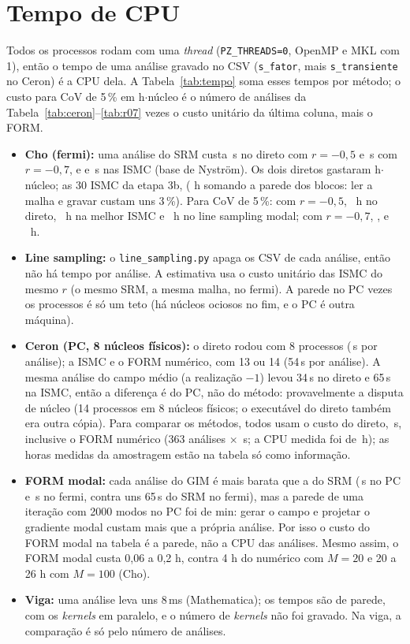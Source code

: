 \documentclass[11pt,a4paper]{article}
\begin{document}
\section{Tempo de CPU}\label{sec:tempo}
Todos os processos rodam com uma \emph{thread} (\texttt{PZ\_THREADS=0}, OpenMP e MKL com 1), então o tempo de
uma análise gravado no CSV (\texttt{s\_fator}, mais \texttt{s\_transiente} no Ceron) é a CPU dela. A
Tabela~\ref{tab:tempo} soma esses tempos por método; o custo para CoV de 5\,\% em h$\cdot$núcleo é o número de análises
da Tabela~\ref{tab:ceron}--\ref{tab:r07} vezes o custo unitário da última coluna, mais o FORM.
\begin{itemize}
  \item \textbf{Cho (fermi):} uma análise do SRM custa \uDirRa{}\,s no direto com $r = -0{,}5$ e \uDirRb{}\,s com
    $r = -0{,}7$, e \uAmRa{} e \uAmRb{}\,s nas ISMC (base de Nyström). Os dois diretos gastaram \hDirTotalCho{}
    h$\cdot$núcleo; as 30 ISMC da etapa 3b, \hIsmcTotal{} (\hIsmcBlocos{} h somando a parede dos blocos: ler a malha e
    gravar custam uns 3\,\%). Para CoV de 5\,\%: com $r = -0{,}5$, \hDirRa{}~h no direto, \hIsmcRa{}~h na melhor ISMC e
    \hLsRa{}~h no line sampling modal; com $r = -0{,}7$, \hDirRb{}, \hIsmcRb{} e \hLsRb{}~h.
  \item \textbf{Line sampling:} o \texttt{line\_sampling.py} apaga os CSV de cada análise, então não há tempo por
    análise. A estimativa usa o custo unitário das ISMC do mesmo $r$ (o mesmo SRM, a mesma malha, no fermi). A parede no
    PC vezes os processos é só um teto (há núcleos ociosos no fim, e o PC é outra máquina).
  \item \textbf{Ceron (PC, 8 núcleos físicos):} o direto rodou com 8 processos (\uDirCe{}\,s por análise); a ISMC e o
    FORM numérico, com 13 ou 14 (54\,s por análise). A mesma análise do campo médio (a realização $-1$) levou 34\,s no
    direto e 65\,s na ISMC, então a diferença é do PC, não do método: provavelmente a disputa de núcleo (14 processos em 8
    núcleos físicos; o executável do direto também era outra cópia). Para comparar os métodos, todos usam o custo do
    direto, \uDirCe{}\,s, inclusive o FORM numérico (363 análises $\times$ \uDirCe{}\,s; a CPU medida foi de
    \formCeronCpu{}\,h); as horas medidas da amostragem estão na tabela só como informação.
  \item \textbf{FORM modal:} cada análise do GIM é mais barata que a do SRM (\gimCpuIt{}\,s no PC e
    \gimCpuItFermi{}\,s no fermi, contra uns 65\,s do SRM no fermi), mas a parede de uma iteração com 2000 modos no PC
    foi de \gimParedeIt{} min: gerar o campo e projetar o gradiente modal
    custam mais que a própria análise. Por isso o custo do FORM modal na tabela é a parede, não a CPU das análises.
    Mesmo assim, o FORM modal custa 0,06 a 0,2 h, contra 4 h do numérico com $M = 20$ e 20 a 26 h com $M = 100$ (Cho).
  \item \textbf{Viga:} uma análise leva uns 8\,ms (Mathematica); os tempos são de parede, com os \emph{kernels} em
    paralelo, e o número de \emph{kernels} não foi gravado. Na viga, a comparação é só pelo número de análises.
\end{itemize}

\end{document}
